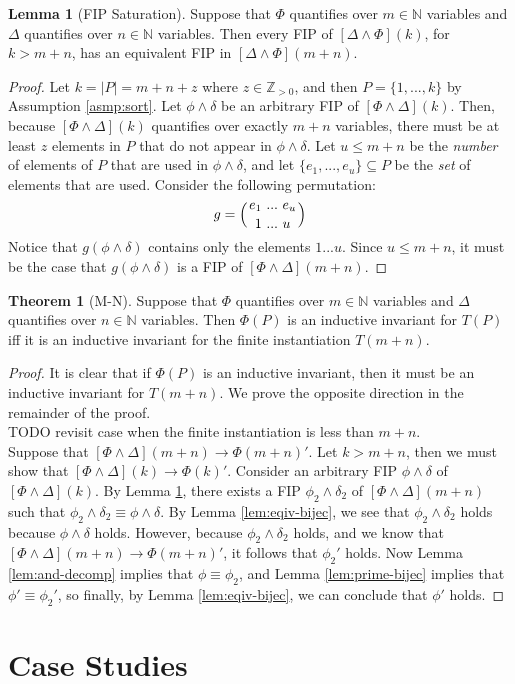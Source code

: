 \documentclass[12pt]{article}
\theoremstyle{definition}
\newtheorem{lemma}{Lemma}
\newtheorem{theorem}{Theorem}
\theoremstyle{remark}
\newcommand{\msp}{\text{ }}
\newcommand{\perm}{\genfrac{}{}{0pt}{}}
\begin{document}
\begin{lemma}[FIP Saturation]
  \label{lem:fip-sat}
  Suppose that $\Phi$ quantifies over $m \in \mathbb{N}$ variables and $\Delta$ quantifies over $n \in \mathbb{N}$ variables.  Then every FIP of $[\Delta \land \Phi](k)$, for $k > m+n$, has an equivalent FIP in $[\Delta \land \Phi](m+n)$.
\end{lemma}
\begin{proof}
  Let $k = |P| = m + n + z$ where $z \in \mathbb{Z}_{>0}$, and then $P = \{1,...,k\}$ by Assumption \ref{asmp:sort}.  Let $\phi\land\delta$ be an arbitrary FIP of $[\Phi\land\Delta](k)$.  Then, because $[\Phi\land\Delta](k)$ quantifies over exactly $m+n$ variables, there must be at least $z$ elements in $P$ that do not appear in $\phi\land\delta$.  Let $u \leq m+n$ be the \textit{number} of elements of $P$ that are used in $\phi \land \delta$, and let $\{e_1,...,e_u\} \subseteq P$ be the \textit{set} of elements that are used.  Consider the following permutation:
  $$g = \left(\perm{e_1 \msp ... \msp e_u}{1 \msp ... \msp u}\right)$$
  Notice that $g(\phi\land\delta)$ contains only the elements $1 ... u$.  Since $u \leq m+n$, it must be the case that $g(\phi\land\delta)$ is a FIP of $[\Phi \land \Delta](m+n)$.
\end{proof}

\begin{theorem}[M-N]
  Suppose that $\Phi$ quantifies over $m \in \mathbb{N}$ variables and $\Delta$ quantifies over $n \in \mathbb{N}$ variables.  Then $\Phi(P)$ is an inductive invariant for $T(P)$ iff it is an inductive invariant for the finite instantiation $T(m+n)$.
\end{theorem}
\begin{proof}
  It is clear that if $\Phi(P)$ is an inductive invariant, then it must be an inductive invariant for $T(m+n)$.  We prove the opposite direction in the remainder of the proof.\\

  TODO revisit case when the finite instantiation is less than $m+n$.\\

  Suppose that $[\Phi\land\Delta](m+n) \rightarrow \Phi(m+n)'$.  Let $k > m+n$, then we must show that $[\Phi\land\Delta](k) \rightarrow \Phi(k)'$.  Consider an arbitrary FIP $\phi\land\delta$ of $[\Phi\land\Delta](k)$.  By Lemma \ref{lem:fip-sat}, there exists a FIP $\phi_2\land\delta_2$ of $[\Phi\land\Delta](m+n)$ such that $\phi_2\land\delta_2 \equiv \phi\land\delta$.  By Lemma \ref{lem:eqiv-bijec}, we see that $\phi_2\land\delta_2$ holds because $\phi\land\delta$ holds.  However, because $\phi_2\land\delta_2$ holds, and we know that $[\Phi\land\Delta](m+n) \rightarrow \Phi(m+n)'$, it follows that $\phi_2'$ holds.  Now Lemma \ref{lem:and-decomp} implies that $\phi \equiv \phi_2$, and Lemma \ref{lem:prime-bijec} implies that $\phi' \equiv \phi_2'$, so finally, by Lemma \ref{lem:eqiv-bijec}, we can conclude that $\phi'$ holds.
\end{proof}


\section{Case Studies}



\end{document}
